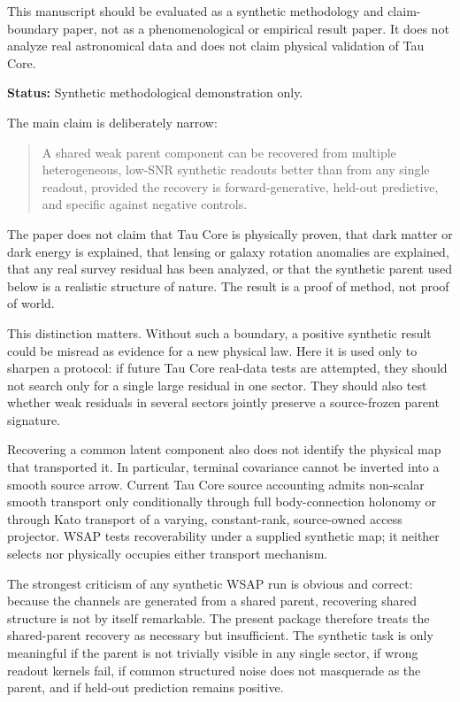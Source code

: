 \documentclass[12pt]{article}
\begin{document}
This manuscript should be evaluated as a synthetic methodology and
claim-boundary paper, not as a phenomenological or empirical result paper.  It
does not analyze real astronomical data and does not claim physical validation
of Tau Core.

\noindent\textbf{Status:} Synthetic methodological demonstration only.

The main claim is deliberately narrow:
\begin{quote}
A shared weak parent component can be recovered from multiple heterogeneous,
low-SNR synthetic readouts better than from any single readout, provided the
recovery is forward-generative, held-out predictive, and specific against
negative controls.
\end{quote}

The paper does not claim that Tau Core is physically proven, that dark matter
or dark energy is explained, that lensing or galaxy rotation anomalies are
explained, that any real survey residual has been analyzed, or that the
synthetic parent used below is a realistic structure of nature.  The result is
a proof of method, not proof of world.

This distinction matters.  Without such a boundary, a positive synthetic result
could be misread as evidence for a new physical law.  Here it is used only to
sharpen a protocol: if future Tau Core real-data tests are attempted, they
should not search only for a single large residual in one sector.  They should
also test whether weak residuals in several sectors jointly preserve a
source-frozen parent signature.

Recovering a common latent component also does not identify the physical map
that transported it. In particular, terminal covariance cannot be inverted
into a smooth source arrow. Current Tau Core source accounting admits
non-scalar smooth transport only conditionally through full body-connection
holonomy or through Kato transport of a varying, constant-rank, source-owned
access projector. WSAP tests recoverability under a supplied synthetic map;
it neither selects nor physically occupies either transport mechanism.

The strongest criticism of any synthetic WSAP run is obvious and correct:
because the channels are generated from a shared parent, recovering shared
structure is not by itself remarkable.  The present package therefore treats the
shared-parent recovery as necessary but insufficient.  The synthetic task is
only meaningful if the parent is not trivially visible in any single sector, if
wrong readout kernels fail, if common structured noise does not masquerade as
the parent, and if held-out prediction remains positive.
\end{document}

